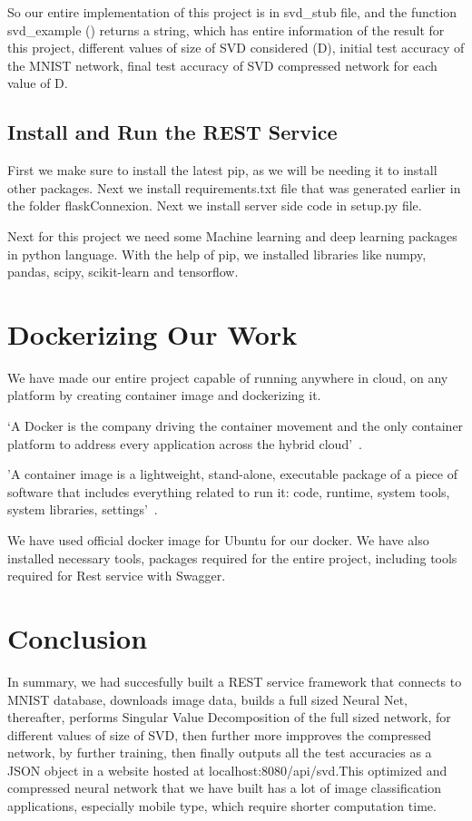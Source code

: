 So our entire implementation of this project is in svd\_stub file, and the
function svd\_example () returns a string, which has entire information of the
result for this project, different values of size of SVD considered (D), initial
test accuracy of the MNIST network, final test accuracy of SVD compressed
network for each value of D.

\subsection{Install and Run the REST Service}

First we make sure to install the latest pip, as we will be needing it to
install other packages. Next we install requirements.txt file that was generated
earlier in the folder flaskConnexion. Next we install server side code in
setup.py file.

Next for this project we need some Machine learning and deep learning packages
in python language. With the help of pip, we installed libraries like numpy,
pandas, scipy, scikit-learn and tensorflow.


\section{Dockerizing Our Work}

We have made our entire project capable of running anywhere in cloud, on any
platform by creating container image and dockerizing it.

`A Docker is the company driving the container movement and the only container
 platform to address every application across the hybrid cloud'~\cite{hid-sp18-401-Docker}.

'A container image is a lightweight, stand-alone, executable package of a piece
 of software that includes everything related to run it: code, runtime, system
 tools, system libraries, settings'~\cite{hid-sp18-401-Container}.

We have used official docker image for Ubuntu for our docker. We have also
installed necessary tools, packages required for the entire project, including
tools required for Rest service with Swagger.

\section{Conclusion}

In summary, we had succesfully built a REST service framework that connects to
MNIST database, downloads image data, builds a full sized Neural Net,
thereafter, performs Singular Value Decomposition of the full sized network, for
different values of size of SVD, then further more impproves the compressed
network, by further training, then finally outputs all the test accuracies as a
JSON object in a website hosted at localhost:8080/api/svd.This optimized and
compressed neural network that we have built has a lot of image classification
applications, especially mobile type, which require  shorter computation time.


